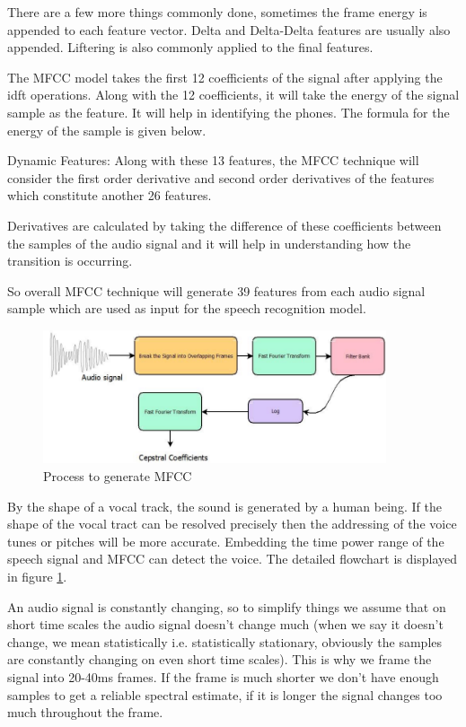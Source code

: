 There are a few more things commonly done, sometimes the frame energy is appended to each feature vector. Delta and Delta-Delta features are usually also appended. Liftering is also commonly applied to the final features.

The MFCC model takes the first 12 coefficients of the signal after applying the idft operations. Along with the 12 coefficients, it will take the energy of the signal sample as the feature. It will help in identifying the phones. The formula for the energy of the sample is given below.

Dynamic Features:
Along with these 13 features, the MFCC technique will consider the first order derivative and second order derivatives of the features which constitute another 26 features.

Derivatives are calculated by taking the difference of these coefficients between the samples of the audio signal and it will help in understanding how the transition is occurring.

So overall MFCC technique will generate 39 features from each audio signal sample which are used as input for the speech recognition model.



\begin{figure}
    \centering
    \includegraphics[width=0.9\textwidth]{02-fundamentals/figures/mfcc_generation.pdf}
    \caption{Process to generate MFCC}
    \label{fig:mfccgeneration}
\end{figure}

By the shape of a vocal track, the sound is generated by
a human being. If the shape of the vocal tract can be
resolved precisely then the addressing of the voice tunes
or pitches will be more accurate. Embedding the time
power range of the speech signal and MFCC can detect
the voice. The detailed flowchart is displayed in figure \ref{fig:mfccgeneration}.

An audio signal is constantly changing, so to simplify things we assume that on short time scales the audio signal doesn't change much (when we say it doesn't change, we mean statistically i.e. statistically stationary, obviously the samples are constantly changing on even short time scales). This is why we frame the signal into 20-40ms frames. If the frame is much shorter we don't have enough samples to get a reliable spectral estimate, if it is longer the signal changes too much throughout the frame.


